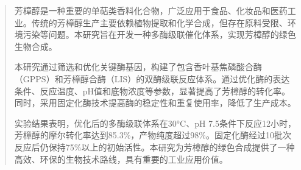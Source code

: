 \documentclass[UTF8,AutoFakeBold=1,AutoFakeSlant,zihao=-4]{HZAU}
\numberwithin{figure}{section}
\numberwithin{table}{section}
\numberwithin{equation}{section}
\begin{document}
\coverpage      %

\newpage
\thispagestyle{empty}  %
\mbox{}  %
\newpage

\whitecoverpage      %




\newpage
\thispagestyle{empty}  %
\mbox{}  %
\newpage

\begin{authorization}
\end{authorization}

\clearpage  %
\thispagestyle{empty}
\hbox{}     %
\vspace*{\fill}
\newpage

\begin{abstract}


芳樟醇是一种重要的单萜类香料化合物，广泛应用于食品、化妆品和医药工业。传统的芳樟醇生产主要依赖植物提取和化学合成，但存在原料受限、环境污染等问题。本研究旨在开发一种多酶级联催化体系，实现芳樟醇的绿色生物合成。

本研究通过筛选和优化关键酶基因，构建了包含香叶基焦磷酸合酶（GPPS）和芳樟醇合酶（LIS）的双酶级联反应体系。通过优化酶的表达条件、反应温度、pH值和底物浓度等参数，显著提高了芳樟醇的转化率。同时，采用固定化酶技术提高酶的稳定性和重复使用率，降低了生产成本。

实验结果表明，优化后的多酶级联体系在30°C、pH 7.5条件下反应12小时，芳樟醇的摩尔转化率达到85.3\%，产物纯度超过98\%。固定化酶经过10批次反应后仍保持75\%以上的初始活性。本研究为芳樟醇的绿色合成提供了一种高效、环保的生物技术路线，具有重要的工业应用价值。
\end{abstract}
\end{document}
